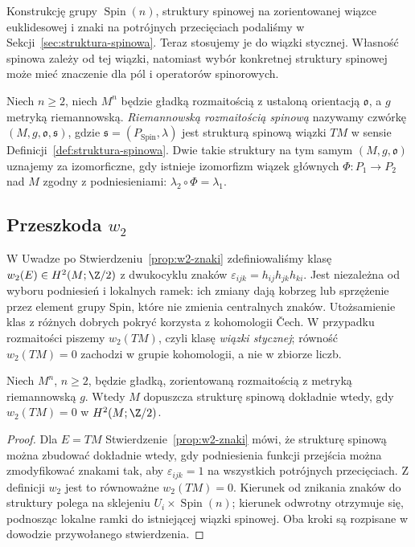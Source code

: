 Konstrukcję grupy $\operatorname{Spin}(n)$, struktury spinowej
na zorientowanej wiązce euklidesowej i znaki na potrójnych
przecięciach podaliśmy w Sekcji~\ref{sec:struktura-spinowa}.
Teraz stosujemy je do wiązki stycznej. Własność spinowa zależy
od tej wiązki, natomiast wybór konkretnej struktury spinowej
może mieć znaczenie dla pól i operatorów spinorowych.

\begin{definicja}
\label{def:rozmaitosc-spinowa}
Niech $n\geq2$, niech $M^n$ będzie gładką rozmaitością
z ustaloną orientacją $\mathfrak o$, a $g$ metryką
riemannowską. \emph{Riemannowską rozmaitością spinową}
nazywamy czwórkę $(M,g,\mathfrak o,\mathfrak s)$,
gdzie $\mathfrak s=(P_{\mathrm{Spin}},\lambda)$ jest
strukturą spinową wiązki $TM$ w sensie
Definicji~\ref{def:struktura-spinowa}.
Dwie takie struktury na tym samym $(M,g,\mathfrak o)$
uznajemy za izomorficzne, gdy istnieje izomorfizm
wiązek głównych $\Phi:P_1\to P_2$ nad $M$ zgodny
z podniesieniami: $\lambda_2\circ\Phi=\lambda_1$.
\end{definicja}

\subsection{Przeszkoda $w_2$}

W Uwadze po Stwierdzeniu~\ref{prop:w2-znaki}
zdefiniowaliśmy klasę $w_2(E)\in H^2(M;\Z/2)$
z dwukocyklu znaków $\varepsilon_{ijk}
=h_{ij}h_{jk}h_{ki}$. Jest niezależna od wyboru
podniesień i lokalnych ramek: ich zmiany dają
kobrzeg lub sprzężenie przez element grupy Spin,
które nie zmienia centralnych znaków.
Utożsamienie klas z różnych dobrych pokryć
korzysta z kohomologii Čech. W przypadku rozmaitości
piszemy $w_2(TM)$, czyli klasę \emph{wiązki stycznej};
równość $w_2(TM)=0$ zachodzi w grupie kohomologii,
a nie w zbiorze liczb.

\begin{twierdzenie}
\label{thm:spin-kryterium-w2}
Niech $M^n$, $n\geq2$, będzie gładką, zorientowaną
rozmaitością z metryką riemannowską $g$.
Wtedy $M$ dopuszcza strukturę spinową dokładnie wtedy,
gdy $w_2(TM)=0$ w $H^2(M;\Z/2)$.
\end{twierdzenie}
\begin{proof}
Dla $E=TM$ Stwierdzenie~\ref{prop:w2-znaki}
mówi, że strukturę spinową można zbudować dokładnie
wtedy, gdy podniesienia funkcji przejścia
można zmodyfikować znakami tak, aby
$\varepsilon_{ijk}=1$ na wszystkich potrójnych przecięciach.
Z definicji $w_2$ jest to równoważne
$w_2(TM)=0$. Kierunek od znikania znaków do struktury
polega na sklejeniu $U_i\times\operatorname{Spin}(n)$;
kierunek odwrotny otrzymuje się, podnosząc lokalne ramki
do istniejącej wiązki spinowej. Oba kroki są rozpisane
w dowodzie przywołanego stwierdzenia.
\end{proof}

